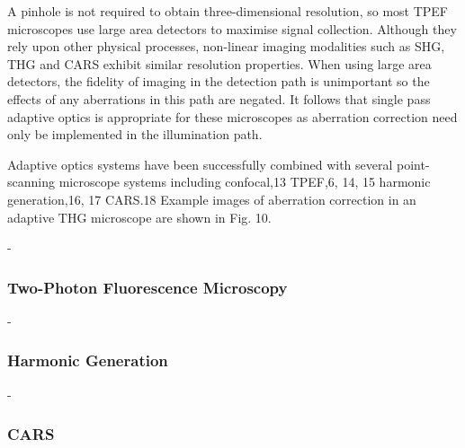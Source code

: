 A pinhole is not required to obtain three-dimensional resolution, so most 
TPEF microscopes use large area detectors to maximise signal collection. 
Although they rely upon other physical processes, non-linear imaging 
modalities such as SHG, THG and CARS exhibit similar resolution properties. 
When using large area detectors, the fidelity of imaging in the detection 
path is unimportant so the effects of any aberrations in this path are 
negated. It follows that single pass adaptive optics is appropriate for these 
microscopes as aberration correction need only be implemented in the 
illumination path.

Adaptive optics systems have been successfully combined with several point-
scanning microscope systems including confocal,13 TPEF,6, 14, 15 harmonic 
generation,16, 17 CARS.18 Example images of aberration correction in an 
adaptive THG microscope are shown in Fig. 10.

\cite{book_confocal}
\cite{AOM_scan_CFM}


-
\subsubsection{Two-Photon Fluorescence Microscopy}
\label{sec:twoPhotonExcitation}

\cite{TPFM_gated_wavefront}
\cite{TPFM_image_based}
\cite{TPFM_pratical}

-
\subsubsection{Harmonic Generation}
\label{sec:HarmonicGeneration}

\cite{HG_embryos}
\cite{HG_dynamic}


-
\subsubsection{CARS}
\label{sec:CARS}

\cite{CARS}



